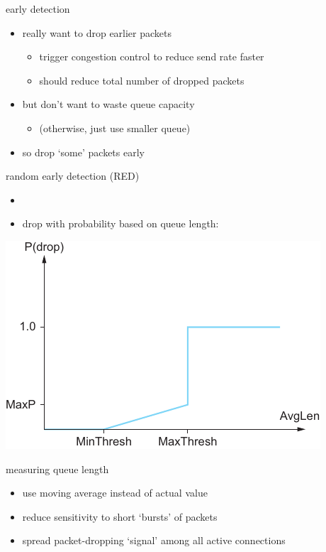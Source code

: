 \usetikzlibrary{calc}
\begin{frame}{early detection}
    \begin{itemize}
    \item really want to drop earlier packets
        \begin{itemize}
        \item trigger congestion control to reduce send rate faster
        \item should reduce total number of dropped packets
        \end{itemize}
    \item but don't want to waste queue capacity
        \begin{itemize}
        \item (otherwise, just use smaller queue)
        \end{itemize}
    \vspace{.5cm}
    \item so drop `some' packets early
    \end{itemize}
\end{frame}

\begin{frame}{random early detection (RED)}
    \begin{itemize}
    \item {}
    \item drop with probability based on queue length:
    \end{itemize}
\includegraphics[height=0.6\pageheight]{../queuing/sysapproach-6-4-fig169}
\end{frame}

\begin{frame}{measuring queue length}
    \begin{itemize}
    \item use moving average instead of actual value
    \vspace{.5cm}
    \item reduce sensitivity to short `bursts' of packets
    \item spread packet-dropping `signal' among all active connections
    \end{itemize}
\end{frame}
